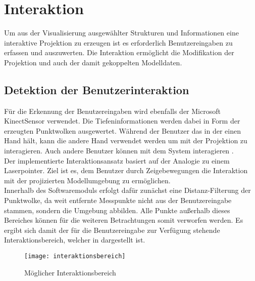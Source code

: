 \chapter{Interaktion}
Um aus der Visualisierung ausgewählter Strukturen und Informationen eine interaktive Projektion zu erzeugen ist es erforderlich Benutzereingaben zu erfassen und auszuwerten. Die Interaktion ermöglicht die Modifikation der Projektion und auch der damit gekoppelten Modelldaten.

\section{Detektion der Benutzerinteraktion}
Für die Erkennung der Benutzereingaben wird ebenfalls der Microsoft Kinect\red[TM] Sensor verwendet. Die Tiefeninformationen werden dabei in Form der erzeugten Punktwolken ausgewertet. Während der Benutzer das \kps{} in der einen Hand hält, kann die andere Hand verwendet werden um mit der Projektion zu interagieren. Auch andere Benutzer können mit dem System interagieren .\\

Der implementierte Interaktionsansatz basiert auf der Analogie zu einem Laserpointer. Ziel ist es, dem Benutzer durch Zeigebewegungen die Interaktion mit der projizierten Modellumgebung zu ermöglichen.\\
Innerhalb des Softwaremoduls \mInteraction {} erfolgt dafür zunächst eine Distanz-Filterung der Punktwolke, da weit entfernte Messpunkte nicht aus der Benutzereingabe stammen, sondern die Umgebung abbilden. Alle Punkte außerhalb dieses Bereiches können für die weiteren Betrachtungen somit verworfen werden. Es ergibt sich damit der für die Benutzereingabe zur Verfügung stehende Interaktionsbereich, welcher in  dargestellt ist.\\

\begin{figure}[!ht]
	\begin{center}
		\texttt{[image: interaktionsbereich]}
		\caption{Möglicher Interaktionsbereich}
		\label{fig.intfov}
	\end{center}
\end{figure}

